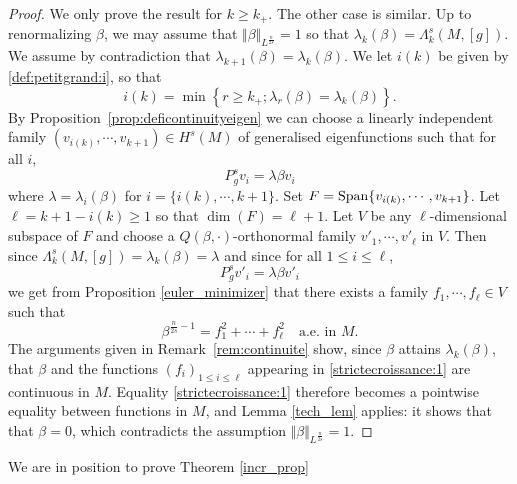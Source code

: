 \documentclass[10pt]{amsart}
\numberwithin{equation}{section}
\def\la{{\lambda}}
\def\span{{\mathop{\rm Span}}}
\theoremstyle{plain}
\theoremstyle{remark}
\begin{document}
\begin{proof}
We only prove the result for $k\geq k_+$. The other case is similar. Up to renormalizing $\beta$, we may assume that  $\Vert \beta \Vert_{L^{\frac{n}{2s}}}=1$ so that $\lambda_k(\beta) = \Lambda_{k}^s(M,[g])$. We assume by contradiction that $\lambda_{k+1}(\beta) = \lambda_k(\beta)$. We let $i(k)$ be given by  \eqref{def:petitgrand:i}, so that 
$$i(k)= \min\left\{ r \geq k_+ ; \la_r (\beta)= \la_{k}(\beta)\right\}.$$
By Proposition~\ref{prop:deficontinuityeigen} we can choose a  linearly independent family $(v_{i(k)},\cdots,v_{k+1}) \in H^s(M)$ of generalised eigenfunctions such that for all $i$, 
$$P_g^s v_i = \la \beta v_i$$ 
where $\la=\la_i(\beta)$ for $i=\{i(k), \cdots, k+1\}.$ Set $F= \span\{v_{i(k)},\cdots,v_{k+1}\}$. Let $\ell=k+1-i(k) \ge 1$ so that $\dim(F)=\ell+1$. 
Let $V$ be any $\ell$-dimensional subspace of $F$ and choose a $Q(\beta, \cdot)$-orthonormal family $v'_1,\cdots,v'_{\ell}$ in $V$. Then since  $\Lambda^s_{k}(M,[g]) = \la_{k}(\beta)=\la$ and since 
for all $1 \le i \le \ell$, $$P_g^s v'_i = \la \beta v'_i$$
we get from Proposition \ref{euler_minimizer} that there exists a family 
$f_1,\cdots,f_\ell \in V$ such that 
\begin{equation} \label{strictecroissance:1}
\beta^{\frac{n}{2s}-1}= f_1^2 + \cdots+f_\ell^2 \quad \text{a.e. in } M.
\end{equation}
The arguments given in Remark~\ref{rem:continuite} show, since $\beta$ attains $\lambda_k(\beta)$, that $\beta$ and the functions $(f_i)_{1 \le i \le \ell}$ appearing in \eqref{strictecroissance:1} are continuous in $M$. Equality \eqref{strictecroissance:1} therefore becomes a pointwise equality between functions in $M$, and Lemma \ref{tech_lem}  applies: it shows that that $\beta=0$, which contradicts the assumption $\Vert \beta \Vert_{L^{\frac{n}{2s}}} =1$.
\end{proof}

We are in position to prove Theorem \ref{incr_prop}
\end{document}
